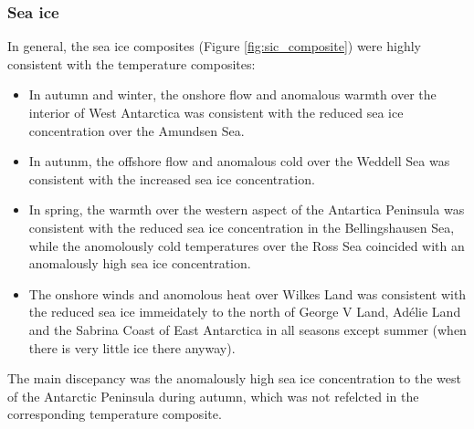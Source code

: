 \subsubsection{Sea ice}

In general, the sea ice composites (Figure \ref{fig:sic_composite}) were highly consistent with the temperature composites: 
\begin{itemize}
\item In autumn and winter, the onshore flow and anomalous warmth over the interior of West Antarctica was consistent with the reduced sea ice concentration over the Amundsen Sea. 
\item In autunm, the offshore flow and anomalous cold over the Weddell Sea was consistent with the increased sea ice concentration. 
\item In spring, the warmth over the western aspect of the Antartica Peninsula was consistent with the reduced sea ice concentration in the Bellingshausen Sea, while the anomolously cold temperatures over the Ross Sea coincided with an anomalously high sea ice concentration.
\item The onshore winds and anomolous heat over Wilkes Land was consistent with the reduced sea ice immeidately to the north of George V Land, Ad{\'e}lie Land and the Sabrina Coast of East Antarctica in all seasons except summer (when there is very little ice there anyway).
\end{itemize}

The main discepancy was the anomalously high sea ice concentration to the west of the Antarctic Peninsula during autumn, which was not refelcted in the corresponding temperature composite.
